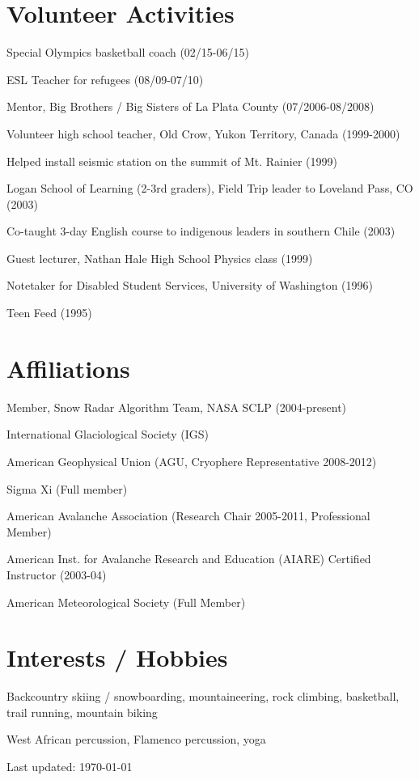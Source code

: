 \documentclass[11pt]{article}
\renewenvironment{itemize}{
  \begin{list}{}{
    \setlength{\leftmargin}{1.5em}
    \setlength{\itemsep}{0pt}
    \setlength{\parskip}{0pt}
  }
}{
  \end{list}
}
\begin{document}
\section*{Volunteer Activities}
\begin{itemize}
\item Special Olympics basketball coach (02/15-06/15)
\item ESL Teacher for refugees (08/09-07/10)
\item Mentor, Big Brothers / Big Sisters of La Plata County (07/2006-08/2008)
\item Volunteer high school teacher, Old Crow, Yukon Territory, Canada (1999-2000)
\item Helped install seismic station on the summit of Mt. Rainier (1999)
\item Logan School of Learning (2-3rd graders), Field Trip leader to Loveland Pass, CO (2003)
\item Co-taught 3-day English course to indigenous leaders in southern Chile (2003)
\item Guest lecturer, Nathan Hale High School Physics class (1999)
\item Notetaker for Disabled Student Services, University of Washington (1996)
\item Teen Feed (1995)
\end{itemize}


\section*{Affiliations}
\begin{itemize}
\item Member, Snow Radar Algorithm Team, NASA SCLP (2004-present)
\item International Glaciological Society (IGS)
\item American Geophysical Union (AGU, Cryophere Representative 2008-2012)
\item Sigma Xi (Full member)
\item American Avalanche Association (Research Chair 2005-2011, Professional Member)
\item American Inst. for Avalanche Research and Education (AIARE) Certified Instructor (2003-04)
\item American Meteorological Society (Full Member)
\end{itemize}


\section*{Interests / Hobbies}
\begin{itemize}
\item Backcountry skiing / snowboarding, mountaineering, rock climbing, basketball, trail running, mountain biking
\item West African percussion, Flamenco percussion, yoga
\end{itemize}


\setlength{\extrarowheight}{5pt}


\bigskip
\begin{center}
  \begin{footnotesize}
    Last updated: \today
  \end{footnotesize}
\end{center}

\end{document}
